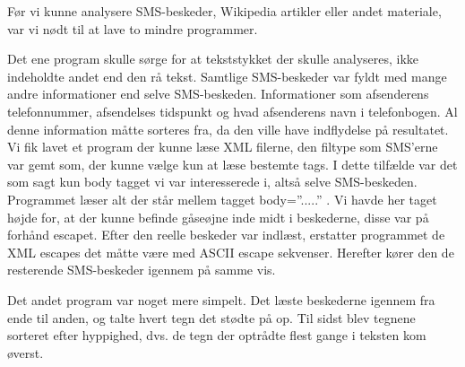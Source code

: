 \label{SmaaProg}
Før vi kunne analysere SMS-beskeder, Wikipedia artikler eller andet materiale, var vi nødt til at lave to mindre programmer.

Det ene program skulle sørge for at tekststykket der skulle analyseres, ikke indeholdte andet end den rå tekst. Samtlige SMS-beskeder var fyldt med mange andre informationer end selve SMS-beskeden. Informationer som afsenderens telefonnummer, afsendelses tidspunkt og hvad afsenderens navn i telefonbogen. Al denne information måtte sorteres fra, da den ville have indflydelse på resultatet. Vi fik lavet et program der kunne læse XML filerne, den filtype som SMS’erne var gemt som, der kunne vælge kun at læse bestemte tags. I dette tilfælde var det som sagt kun body tagget vi var interesserede i, altså selve SMS-beskeden. Programmet læser alt der står mellem tagget body=”.....” . Vi havde her taget højde for, at der kunne befinde gåseøjne inde midt i beskederne, disse var på forhånd escapet. Efter den reelle beskeder var indlæst, erstatter programmet de XML escapes det måtte være med ASCII escape sekvenser. Herefter kører den de resterende SMS-beskeder igennem på samme vis.

Det andet program var noget mere simpelt. Det læste beskederne igennem fra ende til anden, og talte hvert tegn det stødte på op. Til sidst blev tegnene sorteret efter hyppighed, dvs. de tegn der optrådte flest gange i teksten kom øverst.